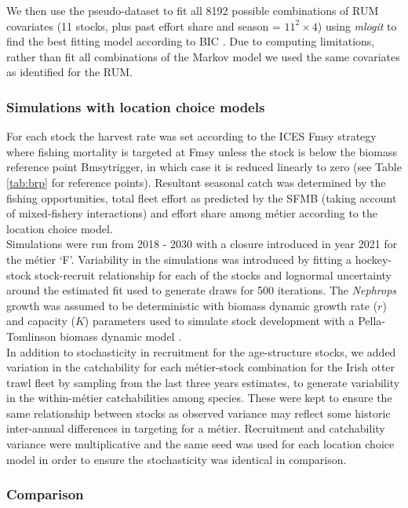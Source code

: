 \documentclass[12pt, halfline, a4paper]{ouparticle}
\begin{document}
We then use the pseudo-dataset to fit all 8192 possible combinations of RUM
covariates (11 stocks, plus past effort share and season = $11^2 \times 4$)
using \textit{mlogit} to find the best fitting model according to BIC
\citep{Schwarz1978}. Due to computing limitations, rather than fit all
combinations of the Markov model we used the same covariates as identified for
the RUM. 

\subsubsection{Simulations with location choice models}

For each stock the harvest rate was set according to the ICES Fmsy strategy
where fishing mortality is targeted at Fmsy unless the stock is below the
biomass reference point Bmsytrigger, in which case it is reduced linearly to
zero (see Table \ref{tab:brp} for reference points). Resultant seasonal catch
was determined by the fishing opportunities, total fleet effort as predicted by
the SFMB (taking account of mixed-fishery interactions) and effort share among
métier according to the location choice model. \\

Simulations were run from 2018 - 2030 with a closure introduced in year 2021
for the métier `F'. Variability in the simulations was introduced by fitting a
hockey-stock stock-recruit relationship for each of the stocks and lognormal
uncertainty around the estimated fit used to generate draws for 500 iterations.
The \textit{Nephrops} growth was assumed to be deterministic with biomass
dynamic growth rate ($r$) and capacity ($K$) parameters used to simulate stock
development with a Pella-Tomlinson biomass dynamic model \citep{Pella1969}. \\

In addition to stochasticity in recruitment for the age-structure stocks, we
added variation in the catchability for each métier-stock combination for the
Irish otter trawl fleet by sampling from the last three years estimates, to
generate variability in the within-métier catchabilities among species. These
were kept to ensure the same relationship between stocks as observed variance
may reflect some historic inter-annual differences in targeting for a métier.
Recruitment and catchability variance were multiplicative and the same seed was
used for each location choice model in order to ensure the stochasticity was
identical in comparison.

\subsubsection{Comparison}
\end{document}
